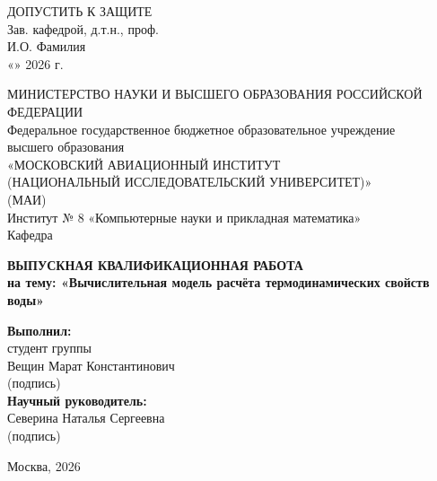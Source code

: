 \begin{titlepage}
\begin{flushright}
    ДОПУСТИТЬ К ЗАЩИТЕ\\
    Зав. кафедрой, д.т.н., проф.\\
    \underline{\hspace{3cm}} И.О. Фамилия\\
    «\underline{\hspace{1cm}}» \underline{\hspace{3cm}} 2026 г.
\end{flushright}

\begin{center}
    МИНИСТЕРСТВО НАУКИ И ВЫСШЕГО ОБРАЗОВАНИЯ РОССИЙСКОЙ ФЕДЕРАЦИИ\\[5mm]
    Федеральное государственное бюджетное образовательное учреждение\\
    высшего образования\\
    «МОСКОВСКИЙ АВИАЦИОННЫЙ ИНСТИТУТ\\
    (НАЦИОНАЛЬНЫЙ ИССЛЕДОВАТЕЛЬСКИЙ УНИВЕРСИТЕТ)»\\
    (МАИ)\\[10mm]
    Институт № 8 «Компьютерные науки и прикладная математика»\\[2mm]
    Кафедра \underline{\hspace{9cm}}\\

    \vspace{2cm}

    {\LARGE \bfseries ВЫПУСКНАЯ КВАЛИФИКАЦИОННАЯ РАБОТА\\[2mm]}
    {\Large \bfseries на тему: «Вычислительная модель расчёта термодинамических свойств воды»\\[5mm]}

    \vspace{1.5cm}

    \begin{flushright}
        \textbf{Выполнил:}\\
        студент группы \underline{\hspace{4cm}}\\
        Вещин Марат Константинович\\
        \underline{\hspace{4cm}} (подпись)\\[5mm]
        \textbf{Научный руководитель:}\\
        Северина Наталья Сергеевна\\
        \underline{\hspace{4cm}} (подпись)\\[5mm]
    \end{flushright}

    \vfill

    Москва, 2026
\end{center}
\end{titlepage}
